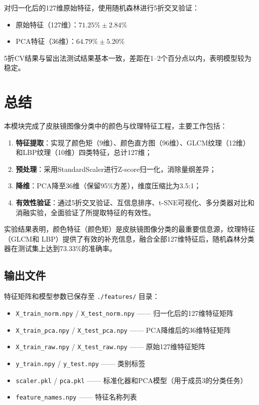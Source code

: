 \documentclass[12pt,a4paper]{ctexart}
\begin{document}
对归一化后的127维原始特征，使用随机森林进行5折交叉验证：
\begin{itemize}
    \item 原始特征（127维）：$71.25\% \pm 2.84\%$
    \item PCA特征（36维）：$64.79\% \pm 5.20\%$
\end{itemize}

5折CV结果与留出法测试结果基本一致，差距在1--2个百分点以内，表明模型较为稳定。

\section{总结}

本模块完成了皮肤镜图像分类中的颜色与纹理特征工程，主要工作包括：

\begin{enumerate}[label=(\arabic*)]
    \item \textbf{特征提取}：实现了颜色矩（9维）、颜色直方图（96维）、GLCM纹理（12维）和LBP纹理（10维）四类特征，总计127维；
    \item \textbf{预处理}：采用StandardScaler进行Z-score归一化，消除量纲差异；
    \item \textbf{降维}：PCA降至36维（保留95\%方差），维度压缩比为3.5:1；
    \item \textbf{有效性验证}：通过5折交叉验证、互信息排序、t-SNE可视化、多分类器对比和消融实验，全面验证了所提取特征的有效性。
\end{enumerate}

实验结果表明，颜色特征（颜色矩）是皮肤镜图像分类的最重要信息源，纹理特征（GLCM和 LBP）提供了有效的补充信息，融合全部127维特征后，随机森林分类器在测试集上达到73.33\%的准确率。

\subsection{输出文件}

特征矩阵和模型参数已保存至 \texttt{./features/} 目录：
\begin{itemize}
    \item \texttt{X\_train\_norm.npy} / \texttt{X\_test\_norm.npy} —— 归一化后的127维特征矩阵
    \item \texttt{X\_train\_pca.npy} / \texttt{X\_test\_pca.npy} —— PCA降维后的36维特征矩阵
    \item \texttt{X\_train\_raw.npy} / \texttt{X\_test\_raw.npy} —— 原始127维特征矩阵
    \item \texttt{y\_train.npy} / \texttt{y\_test.npy} —— 类别标签
    \item \texttt{scaler.pkl} / \texttt{pca.pkl} —— 标准化器和PCA模型（用于成员3的分类任务）
    \item \texttt{feature\_names.npy} —— 特征名称列表
\end{itemize}
\end{document}
